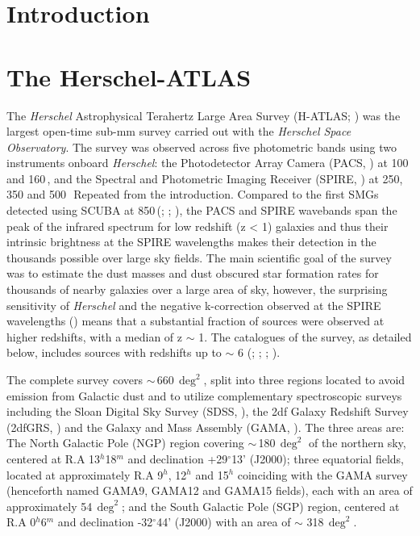 \section{Introduction}

\section{The Herschel-ATLAS}
\label{sec:The Herschel-ATLAS}

The \textit{Herschel} Astrophysical Terahertz Large Area Survey (H-ATLAS; \citealt{Eales_2010}) was the largest open-time sub-mm survey carried out with the \textit{Herschel Space Observatory}. The survey was observed across five photometric bands using two instruments onboard \textit{Herschel}: the Photodetector Array Camera (PACS, \citealt{Poglitsch_2010}) at 100 and 160\,\micron, and the Spectral and Photometric Imaging Receiver (SPIRE, \citealt{Griffin_2010}) at 250, 350 and 500\,\micron\ {\color{red}Repeated from the introduction}. Compared to the first SMGs detected using SCUBA at 850\,\micron (\citealt{Smail_1997}; \citealt{Barger_1998}; \citealt{Hughes_1998}), the PACS and SPIRE wavebands span the peak of the infrared spectrum for low redshift (z < 1) galaxies and thus their intrinsic brightness at the SPIRE wavelengths makes their detection in the thousands possible over large sky fields. The main scientific goal of the survey was to estimate the dust masses and dust obscured star formation rates for thousands of nearby galaxies over a large area of sky, however, the surprising sensitivity of \textit{Herschel} and the negative k-correction observed at the SPIRE wavelengths (\citealt{Blain_1993}) means that a substantial fraction of sources were observed at higher redshifts, with a median of z $\sim$ 1. The catalogues of the survey, as detailed below, includes sources with redshifts up to $\sim$ 6 (\citealt{Amblard_2010}; \citealt{Lapi_2011}; \citealt{Fudamoto_2017}; \citealt{Zavala_2018}).

The complete survey covers $\sim$\,660\,$\deg^2$, split into three regions located to avoid emission from Galactic dust and to utilize complementary spectroscopic surveys including the Sloan Digital Sky Survey (SDSS, \citealt{York_2000}), the 2df Galaxy Redshift Survey (2dfGRS, \citealt{Colless_2001}) and the Galaxy and Mass Assembly (GAMA, \citealt{Driver_2009}). The three areas are: The North Galactic Pole (NGP) region covering $\sim$\,180\,$\deg^2$ of the northern sky, centered at R.A 13$^{h}$18$^{m}$ and declination +29$^{\circ}$13' (J2000); three equatorial fields, located at approximately R.A 9$^{h}$, 12$^{h}$ and 15$^{h}$ coinciding with the GAMA survey (henceforth named GAMA9, GAMA12 and GAMA15 fields), each with an area of approximately 54\,$\deg^2$; and the South Galactic Pole (SGP) region, centered at R.A 0$^{h}$6$^{m}$ and declination -32$^{\circ}$44' (J2000) with an area of $\sim$ 318\,$\deg^2$. 

